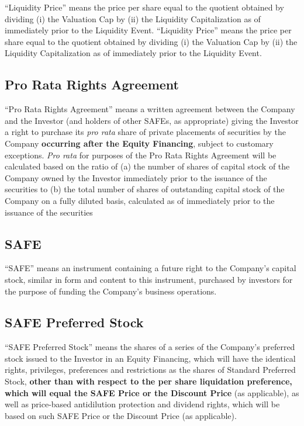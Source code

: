 \ifcap
“Liquidity Price” means the price per share equal to the quotient
obtained by dividing (i) the Valuation Cap by (ii) the Liquidity
Capitalization as of immediately prior to the Liquidity Event.
\else
“Liquidity Price” means the price per share equal to the quotient
obtained by dividing (i) the Valuation Cap by (ii) the Liquidity
Capitalization as of immediately prior to the Liquidity Event.
\fi

\subsection{Pro Rata Rights Agreement}
\label{sec:proratarights}

\begin{sloppypar}
“Pro Rata Rights Agreement” means a written agreement between the
Company and the Investor (and holders of other SAFEs, as appropriate)
giving the Investor a right to purchase its \emph{pro rata} share of
private placements of securities by the Company \textbf{occurring
after the Equity Financing}, subject to customary exceptions.
\emph{Pro rata} for purposes of the Pro Rata Rights Agreement will be
calculated based on the ratio of (a) the number of shares of capital
stock of the Company owned by the Investor immediately prior to the
issuance of the securities to (b) the total number of shares of
outstanding capital stock of the Company on a fully diluted basis,
calculated as of immediately prior to the issuance of the securities
\end{sloppypar}

\subsection{SAFE}
\label{sec:safedef}

\begin{sloppypar}
“SAFE” means an instrument containing a future right to the Company’s
capital stock, similar in form and content to this instrument,
purchased by investors for the purpose of funding the Company’s
business operations.
\end{sloppypar}

\subsection{SAFE Preferred Stock}
\label{sec:safepreferredstock}

“SAFE Preferred Stock” means the shares of a series of the Company’s
preferred stock issued to the Investor in an Equity Financing, which
will have the identical rights, privileges, preferences and
restrictions as the shares of Standard Preferred Stock,\textbf{ other than
with respect to the per share liquidation preference, which will equal
the SAFE Price or the Discount Price} (as applicable), as well as
price-based antidilution protection and dividend rights, which will be
based on such SAFE Price or the Discount Price (as applicable).


